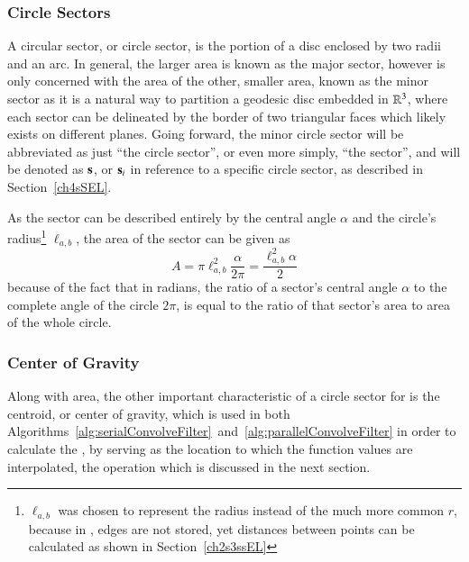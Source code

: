 %
%
\subsubsection{Circle Sectors}
\label{ch2sETBssGsssCS}
A circular sector, or circle sector, is the portion of a disc enclosed by two radii and an arc. In general, the larger area is known as the major sector, however  is only concerned with the area of the other, smaller area, known as the minor sector as it is a natural way to partition a geodesic disc embedded in $\mathbb{R}^{3}$, where each sector can be delineated by the border of two triangular faces which likely exists on different planes. Going forward, the minor circle sector will be abbreviated as just ``the circle sector'', or even more simply, ``the sector'', and will be denoted as $\mathbf{s}$, or $\mathbf{s}_i$ in reference to a specific circle sector, as described in Section~\ref{ch4sSEL}.%
%
%
%

As the sector can be described entirely by the central angle $\alpha$ and the circle's radius\footnote{$\ell_{a,b}$ was chosen to represent the radius instead of the much more common $r$, because in \tdd{}, edges are not stored, yet distances between points can be calculated as shown in Section~\ref{ch2s3ssEL}} $\ell_{a,b}$, the area of the sector can be given as
%
\begin{equation}
	A = \pi \ell_{a,b}^2\frac{\alpha}{2\pi} = \frac{\ell_{a,b}^2\alpha}{2}
	\label{eq:areaOfCircleSector}
\end{equation}
%
because of the fact that in radians, the ratio of a sector's central angle $\alpha$ to the complete angle of the circle $2\pi$, is equal to the ratio of that sector's area to area of the whole circle.~\cite{Weisstein19d}%
%

%
%
\subsubsection{Center of Gravity}
\label{ch2sEBTssGsssCG}
Along with area, the other important characteristic of a circle sector for  is the centroid, or center of gravity, which is used in both Algorithms~\ref{alg:serialConvolveFilter}~and~\ref{alg:parallelConvolveFilter} in order to calculate the , by serving as the location to which the function values are interpolated, the operation which is discussed in the next section.

